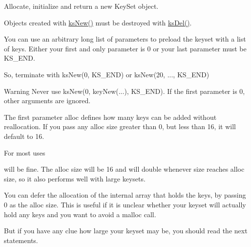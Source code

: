 Allocate, initialize and return a new Key\+Set object. 

Objects created with \mbox{\hyperlink{group__keyset_ga671e1aaee3ae9dc13b4834a4ddbd2c3c}{ks\+New()}} must be destroyed with \mbox{\hyperlink{group__keyset_ga27e5c16473b02a422238c8d970db7ac8}{ks\+Del()}}.

You can use an arbitrary long list of parameters to preload the keyset with a list of keys. Either your first and only parameter is 0 or your last parameter must be K\+S\+\_\+\+E\+ND.

So, terminate with ks\+New(0, K\+S\+\_\+\+E\+N\+D) or ks\+New(20, ..., K\+S\+\_\+\+E\+N\+D)

\begin{DoxyWarning}{Warning}
Never use ks\+New(0, key\+New(...), K\+S\+\_\+\+E\+N\+D). If the first parameter is 0, other arguments are ignored.
\end{DoxyWarning}
The first parameter {\ttfamily alloc} defines how many keys can be added without reallocation. If you pass any alloc size greater than 0, but less than 16, it will default to 16.

For most uses


\begin{DoxyCodeInclude}{0}
\DoxyCodeLine{\textcolor{comment}{// enough memory for up to 16 keys, without needing reallocation}}
\end{DoxyCodeInclude}
 will be fine. The alloc size will be 16 and will double whenever size reaches alloc size, so it also performs well with large keysets.

You can defer the allocation of the internal array that holds the keys, by passing 0 as the alloc size. This is useful if it is unclear whether your keyset will actually hold any keys and you want to avoid a malloc call.


\begin{DoxyCodeInclude}{0}
\DoxyCodeLine{\textcolor{comment}{// Create KeySet without allocating memory for keys}}
\DoxyCodeLine{\textcolor{comment}{// The first allocation will happen in ksAppendKey}}
\DoxyCodeLine{\textcolor{comment}{// work with the KeySet}}
\end{DoxyCodeInclude}
 But if you have any clue how large your keyset may be, you should read the next statements.

